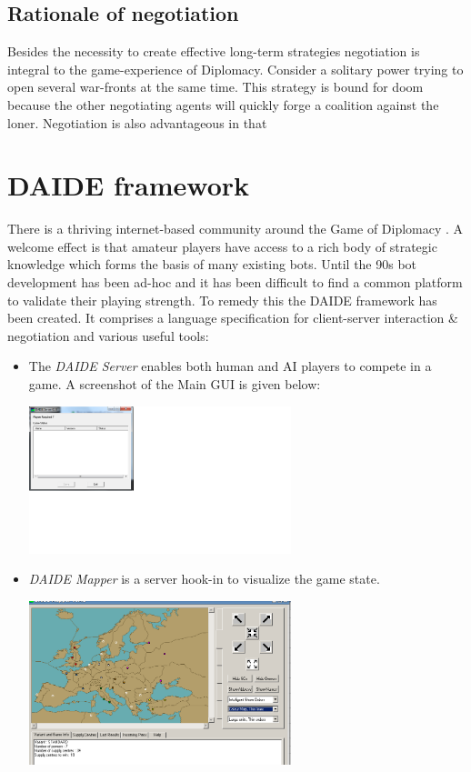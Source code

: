 \documentclass[pdftex,12pt,a4paper]{report}
\begin{document}
\subsection{Rationale of negotiation}

Besides the necessity to create effective long-term strategies
negotiation is integral to the game-experience of Diplomacy.
Consider a solitary power trying to open several war-fronts
at the same time. This strategy is bound for doom because 
the other negotiating agents will quickly forge a coalition
against the loner. Negotiation is also advantageous in that


\section{DAIDE framework}

There is a thriving internet-based community around the Game of
Diplomacy \cite{DipArchive04} \cite{DipPouch04}. A welcome effect
is that amateur players have access to a rich body of strategic
knowledge which forms the basis of many existing bots. Until the
90s bot development has been ad-hoc and it has been difficult
to find a common platform to validate their playing strength. To remedy
this the DAIDE framework \cite{Daide04} has been created. It comprises
a language specification for client-server interaction \cite{DAIDEsyntax10}
 \& negotiation and various useful tools: 

\begin{itemize}

\item The \textit{DAIDE Server} enables both human and AI players to
      compete in a game. A screenshot of the Main GUI is given below:

\includegraphics[width=0.60\textwidth]{./images/DAIDEServer.png}

\item \textit{DAIDE Mapper} is a server hook-in to visualize
      the game state.



\includegraphics[width=0.60\textwidth]{./images/DAIDEMapper.png}

\end{itemize}
\end{document}
